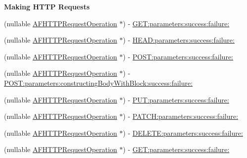 \begin{Indent}\textbf{ Making H\+T\+TP Requests}\par
{\em 

 

 }\begin{DoxyCompactItemize}
\item 
(nullable \mbox{\hyperlink{interface_a_f_h_t_t_p_request_operation}{A\+F\+H\+T\+T\+P\+Request\+Operation}} $\ast$) -\/ \mbox{\hyperlink{interface_a_f_h_t_t_p_request_operation_manager_a78c2fe321e78ae8bba178c3a7bcbcbf8}{G\+E\+T\+:parameters\+:success\+:failure\+:}}
\item 
(nullable \mbox{\hyperlink{interface_a_f_h_t_t_p_request_operation}{A\+F\+H\+T\+T\+P\+Request\+Operation}} $\ast$) -\/ \mbox{\hyperlink{interface_a_f_h_t_t_p_request_operation_manager_a4174a7ffaea5282519d2d630af6ebd56}{H\+E\+A\+D\+:parameters\+:success\+:failure\+:}}
\item 
(nullable \mbox{\hyperlink{interface_a_f_h_t_t_p_request_operation}{A\+F\+H\+T\+T\+P\+Request\+Operation}} $\ast$) -\/ \mbox{\hyperlink{interface_a_f_h_t_t_p_request_operation_manager_ac8aa240cb2e04948dedabe61c29150f5}{P\+O\+S\+T\+:parameters\+:success\+:failure\+:}}
\item 
(nullable \mbox{\hyperlink{interface_a_f_h_t_t_p_request_operation}{A\+F\+H\+T\+T\+P\+Request\+Operation}} $\ast$) -\/ \mbox{\hyperlink{interface_a_f_h_t_t_p_request_operation_manager_a81aa57fcece5c05e1b6f4f7504c73703}{P\+O\+S\+T\+:parameters\+:constructing\+Body\+With\+Block\+:success\+:failure\+:}}
\item 
(nullable \mbox{\hyperlink{interface_a_f_h_t_t_p_request_operation}{A\+F\+H\+T\+T\+P\+Request\+Operation}} $\ast$) -\/ \mbox{\hyperlink{interface_a_f_h_t_t_p_request_operation_manager_aa3d3915a3f9bfb06fab881cf3a9affb3}{P\+U\+T\+:parameters\+:success\+:failure\+:}}
\item 
(nullable \mbox{\hyperlink{interface_a_f_h_t_t_p_request_operation}{A\+F\+H\+T\+T\+P\+Request\+Operation}} $\ast$) -\/ \mbox{\hyperlink{interface_a_f_h_t_t_p_request_operation_manager_a45781bd7d5d3ac10da2692964a5eb990}{P\+A\+T\+C\+H\+:parameters\+:success\+:failure\+:}}
\item 
(nullable \mbox{\hyperlink{interface_a_f_h_t_t_p_request_operation}{A\+F\+H\+T\+T\+P\+Request\+Operation}} $\ast$) -\/ \mbox{\hyperlink{interface_a_f_h_t_t_p_request_operation_manager_a5b264d221dc9185e642e11b86cfc4072}{D\+E\+L\+E\+T\+E\+:parameters\+:success\+:failure\+:}}
\item 
(nullable \mbox{\hyperlink{interface_a_f_h_t_t_p_request_operation}{A\+F\+H\+T\+T\+P\+Request\+Operation}} $\ast$) -\/ \mbox{\hyperlink{interface_a_f_h_t_t_p_request_operation_manager_a78c2fe321e78ae8bba178c3a7bcbcbf8}{G\+E\+T\+:parameters\+:success\+:failure\+:}}

\end{DoxyCompactItemize}
\end{Indent}
